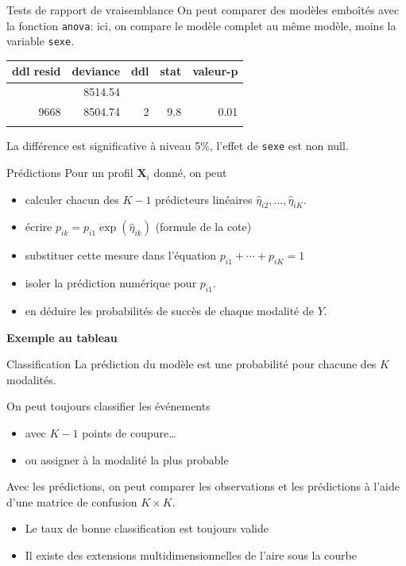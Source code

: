 \documentclass[
  ignorenonframetext,
]{beamer}
\providecommand{\tightlist}{%
  \setlength{\itemsep}{0pt}\setlength{\parskip}{0pt}}\usepackage{longtable,booktabs,array}
\begin{document}
\begin{frame}[fragile]{Tests de rapport de vraisemblance}
\protect\hypertarget{tests-de-rapport-de-vraisemblance}{}
On peut comparer des modèles emboîtés avec la fonction \texttt{anova}:
ici, on compare le modèle complet au même modèle, moins la variable
\texttt{sexe}.

\begin{longtable}[]{@{}rrrrr@{}}
\toprule\noalign{}
ddl resid & deviance & ddl & stat & valeur-p \\
\midrule\noalign{}
\endhead
9670 & 8514.54 & & & \\
9668 & 8504.74 & 2 & 9.8 & 0.01 \\
\bottomrule\noalign{}
\end{longtable}

La différence est significative à niveau 5\%, l'effet de \texttt{sexe}
est non null.
\end{frame}

\begin{frame}{Prédictions}
\protect\hypertarget{pruxe9dictions}{}
Pour un profil \(\mathbf{X}_i\) donné, on peut

\begin{itemize}
\tightlist
\item
  calculer chacun des \(K-1\) prédicteurs linéaires
  \(\widehat{\eta}_{i2}, \ldots, \widehat{\eta}_{iK}\).
\item
  écrire \(p_{ik} = p_{i1}\exp(\widehat{\eta}_{ik})\) (formule de la
  cote)
\item
  substituer cette mesure dans l'équation \(p_{i1} + \cdots + p_{iK}=1\)
\item
  isoler la prédiction numérique pour \(p_{i1}\).
\item
  en déduire les probabilités de succès de chaque modalité de \(Y\).
\end{itemize}

\textbf{Exemple au tableau}
\end{frame}

\begin{frame}{Classification}
\protect\hypertarget{classification}{}
La prédiction du modèle est une probabilité pour chacune des \(K\)
modalités.

On peut toujours classifier les événements

\begin{itemize}
\tightlist
\item
  avec \(K-1\) points de coupure\ldots{}
\item
  ou assigner à la modalité la plus probable
\end{itemize}

Avec les prédictions, on peut comparer les observations et les
prédictions à l'aide d'une matrice de confusion \(K \times K\).

\begin{itemize}
\tightlist
\item
  Le taux de bonne classification est toujours valide
\item
  Il existe des extensions multidimensionnelles de l'aire sous la courbe
\end{itemize}
\end{frame}
\end{document}
